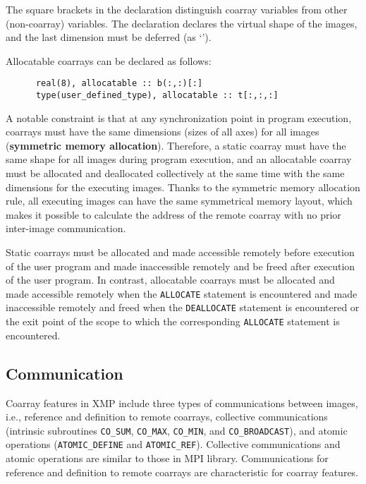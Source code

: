 The square brackets in the declaration distinguish coarray variables from 
other (non-coarray) variables. The declaration declares the virtual shape of the images, and the last 
dimension must be deferred (as `{\tt *}').

Allocatable coarrays can be declared as follows:
\begin{verbatim}
      real(8), allocatable :: b(:,:)[:]
      type(user_defined_type), allocatable :: t[:,:,:]
\end{verbatim}


A notable constraint is that at any synchronization point in program execution, 
coarrays must have the same dimensions (sizes of all axes) for all images
({\bf symmetric memory allocation}). 
Therefore, a static coarray must have the same shape for all images during 
program execution, and an allocatable coarray must be allocated and deallocated 
collectively at the same time with the same dimensions for the executing images.
Thanks to the symmetric memory allocation rule, all executing images can have
the same symmetrical memory layout, which makes it possible to calculate the address 
of the remote coarray with no prior inter-image communication.

\requirement
Static coarrays must be allocated and made accessible remotely
before execution of the user program and 
made inaccessible remotely and be freed after execution of the user program.
In contrast, allocatable coarrays must be allocated and made accessible remotely
when the {\tt ALLOCATE} statement is encountered and 
made inaccessible remotely and freed when the {\tt DEALLOCATE} statement is encountered or 
the exit point of the scope to which the corresponding {\tt ALLOCATE} statement is encountered.


\subsection{Communication}\label{sec:spec-comm}

Coarray features in XMP include three types of communications between images, i.e.,
reference and definition to remote coarrays,
collective communications (intrinsic subroutines {\tt CO\_SUM}, {\tt CO\_MAX}, 
{\tt CO\_MIN}, and {\tt CO\_BROADCAST}), and
atomic operations ({\tt ATOMIC\_DEFINE} and {\tt ATOMIC\_REF}).
%
Collective communications and atomic operations are similar to those
in MPI library.
Communications for reference and definition to remote coarrays are 
characteristic for coarray features.


